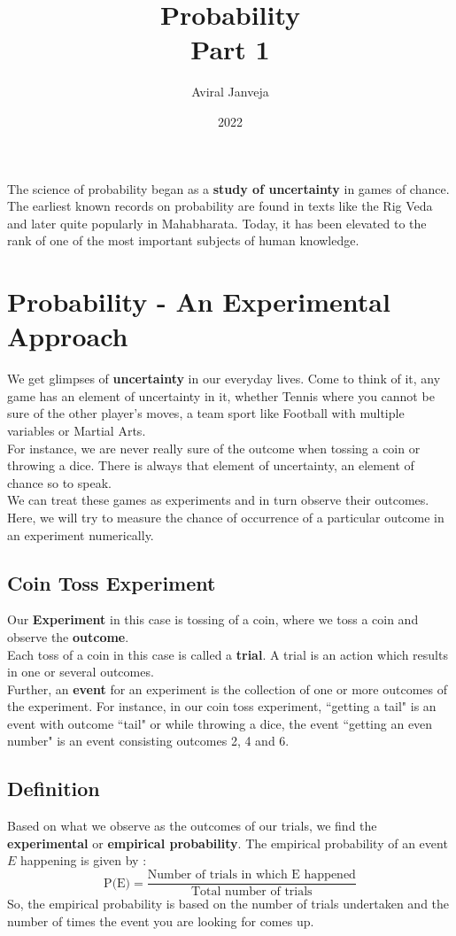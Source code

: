 \documentclass[12pt, letterpaper]{article}
\title{\textbf{\Huge Probability \\ Part 1}}
\author{Aviral Janveja}
\date{2022}
\begin{document}
\maketitle

The science of probability began as a \textbf{study of uncertainty} in games of chance. The earliest known records on probability are found in texts like the Rig Veda and later quite popularly in Mahabharata. Today, it has been elevated to the rank of one of the most important subjects of human knowledge.

\section{Probability - An Experimental Approach}

We get glimpses of \textbf{uncertainty} in our everyday lives. Come to think of it, any game has an element of uncertainty in it, whether Tennis where you cannot be sure of the other player's moves, a team sport like Football with multiple variables or Martial Arts.\\
For instance, we are never really sure of the outcome when tossing a coin or throwing a dice. There is always that element of uncertainty, an element of chance so to speak.\\
We can treat these games as experiments and in turn observe their outcomes. Here, we will try to measure the chance of occurrence of a particular outcome in an experiment numerically.

\subsection{Coin Toss Experiment}
Our \textbf{Experiment} in this case is tossing of a coin, where we toss a coin and observe the \textbf{outcome}.\\
Each toss of a coin in this case is called a \textbf{trial}. A trial is an action which results in one or several outcomes.\\
Further, an \textbf{event} for an experiment is the collection of one or more outcomes of the experiment. For instance, in our coin toss experiment, ``getting a tail" is an event with outcome ``tail" or while throwing a dice, the event ``getting an even number" is an event consisting outcomes 2, 4 and 6.

\subsection{Definition}
Based on what we observe as the outcomes of our trials, we find the \textbf{experimental} or \textbf{empirical probability}. The empirical probability of an event $E$ happening is given by : 
\begin{displaymath}
    \text{P(E)} = \frac{\text{Number of trials in which E happened}}{\text{Total number of trials}}
\end{displaymath}
So, the empirical probability is based on the number of trials undertaken and the number of times the event you are looking for comes up.
\end{document}
